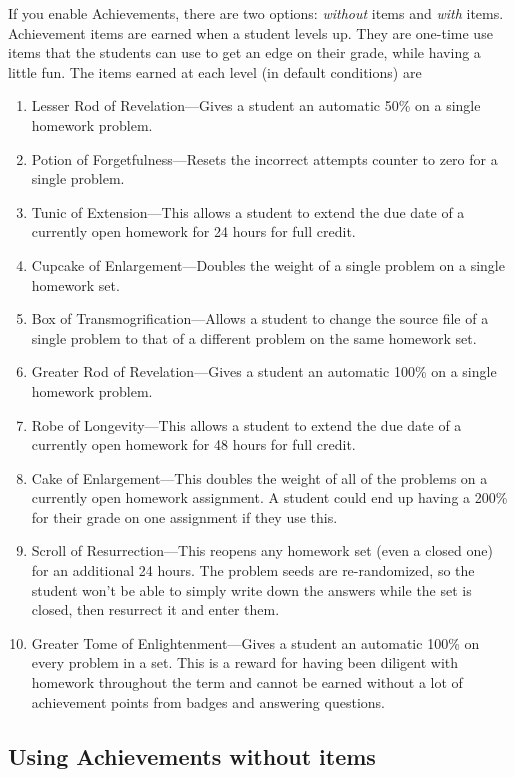 \documentclass[12pt]{article}
\begin{document}
If you enable Achievements, there are two options: \emph{without} items and \emph{with} items. Achievement items are earned when a student levels up. They are one-time use  items that the students can use to get an edge on their grade, while having a little fun. The items earned at each level (in default conditions) are
\begin{enumerate}
\item Lesser Rod of Revelation---Gives a student an automatic 50\% on a single homework problem.
\item Potion of Forgetfulness---Resets the incorrect attempts counter to zero for a single problem.
\item Tunic of Extension---This allows a student to extend the due date of a currently open homework for 24 hours for full credit.
\item Cupcake of Enlargement---Doubles the weight of a single problem on a single homework set.
\item Box of Transmogrification---Allows a student to change the source file of a single problem to that of a different problem on the same homework set.
\item Greater Rod of Revelation---Gives a student an automatic 100\% on a single homework problem.
\item Robe of Longevity---This allows a student to extend the due date of a currently open homework for 48 hours for full credit.
\item Cake of Enlargement---This doubles the weight of all of the problems on a currently open homework assignment. A student could end up having a 200\% for their grade on one assignment if they use this.
\item Scroll of Resurrection---This reopens any homework set (even a closed one) for an additional 24 hours. The problem seeds are re-randomized, so the student won't be able to simply write down the answers while the set is closed, then resurrect it and enter them.
\item Greater Tome of Enlightenment---Gives a student an automatic 100\% on every problem in a set. This is a reward for having been diligent with homework throughout the term and cannot be earned without a lot of achievement points from badges and answering questions.
\end{enumerate}

\subsection{Using Achievements without items}
\end{document}
